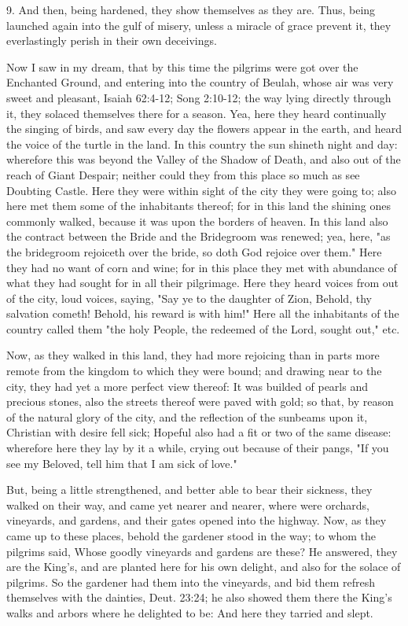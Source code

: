 9. And then, being hardened, they show themselves as they are. Thus,
being launched again into the gulf of misery, unless a miracle of grace
prevent it, they everlastingly perish in their own deceivings.

Now I saw in my dream, that by this time the pilgrims were got over the
Enchanted Ground, and entering into the country of Beulah, whose air
was very sweet and pleasant, Isaiah 62:4-12; Song 2:10-12; the way
lying directly through it, they solaced themselves there for a season.
Yea, here they heard continually the singing of birds, and saw every
day the flowers appear in the earth, and heard the voice of the turtle
in the land. In this country the sun shineth night and day: wherefore
this was beyond the Valley of the Shadow of Death, and also out of the
reach of Giant Despair; neither could they from this place so much as
see Doubting Castle. Here they were within sight of the city they were
going to; also here met them some of the inhabitants thereof; for in
this land the shining ones commonly walked, because it was upon the
borders of heaven. In this land also the contract between the Bride and
the Bridegroom was renewed; yea, here, "as the bridegroom rejoiceth
over the bride, so doth God rejoice over them." Here they had no want
of corn and wine; for in this place they met with abundance of what
they had sought for in all their pilgrimage. Here they heard voices
from out of the city, loud voices, saying, "Say ye to the daughter of
Zion, Behold, thy salvation cometh! Behold, his reward is with him!"
Here all the inhabitants of the country called them "the holy People,
the redeemed of the Lord, sought out," etc.

Now, as they walked in this land, they had more rejoicing than in parts
more remote from the kingdom to which they were bound; and drawing near
to the city, they had yet a more perfect view thereof: It was builded
of pearls and precious stones, also the streets thereof were paved with
gold; so that, by reason of the natural glory of the city, and the
reflection of the sunbeams upon it, Christian with desire fell sick;
Hopeful also had a fit or two of the same disease: wherefore here they
lay by it a while, crying out because of their pangs, "If you see my
Beloved, tell him that I am sick of love."

But, being a little strengthened, and better able to bear their
sickness, they walked on their way, and came yet nearer and nearer,
where were orchards, vineyards, and gardens, and their gates opened
into the highway. Now, as they came up to these places, behold the
gardener stood in the way; to whom the pilgrims said, Whose goodly
vineyards and gardens are these? He answered, they are the King's, and
are planted here for his own delight, and also for the solace of
pilgrims. So the gardener had them into the vineyards, and bid them
refresh themselves with the dainties, Deut. 23:24; he also showed them
there the King's walks and arbors where he delighted to be: And here
they tarried and slept.

